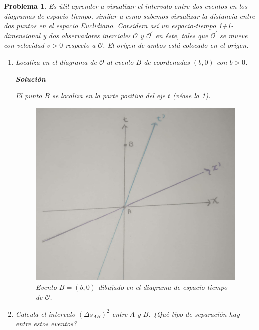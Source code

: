 \documentclass[12pt]{article}
\theoremstyle{break}
\newtheorem{exercise}{Problema}
\theoremstyle{nonumberbreak}
\newcommand*{\observer}{\mathcal{O}}
\newcommand*{\primeobserver}{\mathcal{O}^{\prime}}
\newcommand*{\inlinesol}{\vspace*{10pt}\textbf{Solución}\vspace*{10pt}}
\begin{document}
    \pagebreak
    \begin{exercise}
        Es útil aprender a visualizar el intervalo entre dos eventos en los diagramas de espacio-tiempo, similar a como sabemos visualizar la distancia entre dos puntos en el espacio Euclidiano. Considera así un espacio-tiempo 1+1-dimensional y dos observadores inerciales \(\observer\) y \(\primeobserver\) en éste, tales que \(\primeobserver\) se mueve con velocidad \(v > 0\) respecto a \(\observer\). El origen de ambos está colocado en el origen.

        \begin{enumerate}[label = \alph*)]
            \item Localiza en el diagrama de \(\observer\) al evento \(B\) de coordenadas \((b, 0)\) con \(b > 0\).
            
            \inlinesol

            El punto \(B\) se localiza en la parte positiva del eje \(t\) (véase la \cref{fig:Bequalsb0InO}).

            \begin{figure}[htb]
                \centering
                \includegraphics[scale = 0.15]{fig-2.8.pdf}
                \caption{Evento \(B = (b, 0)\) dibujado en el diagrama de espacio-tiempo de \(\observer\).}
                \label{fig:Bequalsb0InO}
            \end{figure}

            \item Calcula el intervalo \((\Delta s_{AB})^{2}\) entre \(A\) y \(B\). ¿Qué tipo de separación hay entre estos eventos?
            

\end{enumerate}
\end{exercise}
\end{document}
